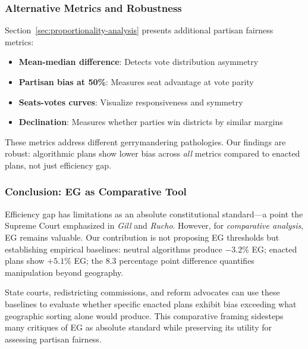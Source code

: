 \subsubsection{Alternative Metrics and Robustness}

Section~\ref{sec:proportionality-analysis} presents additional partisan fairness metrics:
\begin{itemize}
    \item \textbf{Mean-median difference}: Detects vote distribution asymmetry
    \item \textbf{Partisan bias at 50\%}: Measures seat advantage at vote parity
    \item \textbf{Seats-votes curves}: Visualize responsiveness and symmetry
    \item \textbf{Declination}: Measures whether parties win districts by similar margins
\end{itemize}

These metrics address different gerrymandering pathologies. Our findings are robust: algorithmic plans show lower bias across \emph{all} metrics compared to enacted plans, not just efficiency gap.

\subsubsection{Conclusion: EG as Comparative Tool}

Efficiency gap has limitations as an absolute constitutional standard---a point the Supreme Court emphasized in \emph{Gill} and \emph{Rucho}. However, for \emph{comparative analysis}, EG remains valuable. Our contribution is not proposing EG thresholds but establishing empirical baselines: neutral algorithms produce $-3.2\%$ EG; enacted plans show $+5.1\%$ EG; the 8.3 percentage point difference quantifies manipulation beyond geography.

State courts, redistricting commissions, and reform advocates can use these baselines to evaluate whether specific enacted plans exhibit bias exceeding what geographic sorting alone would produce. This comparative framing sidesteps many critiques of EG as absolute standard while preserving its utility for assessing partisan fairness.
